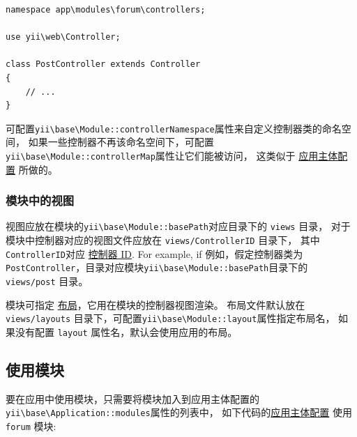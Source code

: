 \lstset{language=php}\begin{lstlisting}
namespace app\modules\forum\controllers;

use yii\web\Controller;

class PostController extends Controller
{
    // ...
}
\end{lstlisting}
可配置\texttt{yii{\allowbreak{}\textbackslash}base{\allowbreak{}\textbackslash}Module\allowbreak{}::\allowbreak{}controllerNamespace}属性来自定义控制器类的命名空间，
如果一些控制器不再该命名空间下，可配置\texttt{yii{\allowbreak{}\textbackslash}base{\allowbreak{}\textbackslash}Module\allowbreak{}::\allowbreak{}controllerMap}属性让它们能被访问，
这类似于 \hyperref[structure-applications.md::controller-map]{应用主体配置} 所做的。

\subsubsection{模块中的视图 \label{structure-modules.md::views-in-modules}}
视图应放在模块的\texttt{yii{\allowbreak{}\textbackslash}base{\allowbreak{}\textbackslash}Module\allowbreak{}::\allowbreak{}basePath}对应目录下的 \lstinline|views| 目录，
对于模块中控制器对应的视图文件应放在 \lstinline|views/ControllerID| 目录下，
其中\lstinline|ControllerID|对应 \hyperref[structure-controllers.md::routes]{控制器 ID}. For example, if
例如，假定控制器类为\lstinline|PostController|，目录对应模块\texttt{yii{\allowbreak{}\textbackslash}base{\allowbreak{}\textbackslash}Module\allowbreak{}::\allowbreak{}basePath}目录下的 \lstinline|views/post| 目录。

模块可指定 \hyperref[structure-views.md::layouts]{布局}，它用在模块的控制器视图渲染。
布局文件默认放在 \lstinline|views/layouts| 目录下，可配置\texttt{yii{\allowbreak{}\textbackslash}base{\allowbreak{}\textbackslash}Module\allowbreak{}::\allowbreak{}layout}属性指定布局名，
如果没有配置 \lstinline|layout| 属性名，默认会使用应用的布局。

\subsection{使用模块 \label{structure-modules.md::using-modules}}
要在应用中使用模块，只需要将模块加入到应用主体配置的\texttt{yii{\allowbreak{}\textbackslash}base{\allowbreak{}\textbackslash}Application\allowbreak{}::\allowbreak{}modules}属性的列表中，
如下代码的\hyperref[structure-applications.md::application-configurations]{应用主体配置} 使用 \lstinline|forum| 模块:

